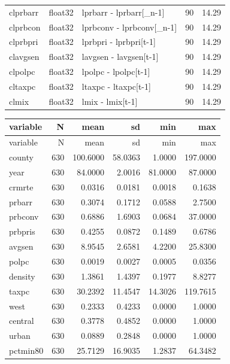 \documentclass{article}
\begin{document}
\begin{longtable}{p{} r p{} r r}
clprbarr & float32 & lprbarr - lprbarr[\_n-1] & 90 & 14.29 \\
clprbcon & float32 & lprbconv - lprbconv[\_n-1] & 90 & 14.29 \\
clprbpri & float32 & lprbpri - lprbpri[t-1] & 90 & 14.29 \\
clavgsen & float32 & lavgsen - lavgsen[t-1] & 90 & 14.29 \\
clpolpc & float32 & lpolpc - lpolpc[t-1] & 90 & 14.29 \\
cltaxpc & float32 & ltaxpc - ltaxpc[t-1] & 90 & 14.29 \\
clmix & float32 & lmix - lmix[t-1] & 90 & 14.29 \\
\bottomrule
\end{longtable}

\begin{longtable}{p{} r r r r r}
\toprule
\multicolumn{1}{l}{variable} & \multicolumn{1}{r}{N} & \multicolumn{1}{r}{mean} & \multicolumn{1}{r}{sd} & \multicolumn{1}{r}{min} & \multicolumn{1}{r}{max} \\
\midrule
\endfirsthead
\toprule
\multicolumn{1}{l}{variable} & \multicolumn{1}{r}{N} & \multicolumn{1}{r}{mean} & \multicolumn{1}{r}{sd} & \multicolumn{1}{r}{min} & \multicolumn{1}{r}{max} \\
\midrule
\endhead
county & 630 & 100.6000 & 58.0363 & 1.0000 & 197.0000 \\
year & 630 & 84.0000 & 2.0016 & 81.0000 & 87.0000 \\
crmrte & 630 & 0.0316 & 0.0181 & 0.0018 & 0.1638 \\
prbarr & 630 & 0.3074 & 0.1712 & 0.0588 & 2.7500 \\
prbconv & 630 & 0.6886 & 1.6903 & 0.0684 & 37.0000 \\
prbpris & 630 & 0.4255 & 0.0872 & 0.1489 & 0.6786 \\
avgsen & 630 & 8.9545 & 2.6581 & 4.2200 & 25.8300 \\
polpc & 630 & 0.0019 & 0.0027 & 0.0005 & 0.0356 \\
density & 630 & 1.3861 & 1.4397 & 0.1977 & 8.8277 \\
taxpc & 630 & 30.2392 & 11.4547 & 14.3026 & 119.7615 \\
west & 630 & 0.2333 & 0.4233 & 0.0000 & 1.0000 \\
central & 630 & 0.3778 & 0.4852 & 0.0000 & 1.0000 \\
urban & 630 & 0.0889 & 0.2848 & 0.0000 & 1.0000 \\
pctmin80 & 630 & 25.7129 & 16.9035 & 1.2837 & 64.3482 \\

\end{longtable}
\end{document}
